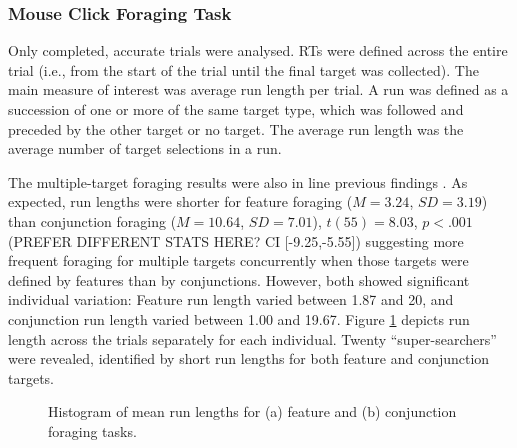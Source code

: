 \documentclass[]{rsos}%
\begin{document}
\subsubsection{Mouse Click Foraging Task}

Only completed, accurate trials were analysed. RTs were defined across the entire trial (i.e., from the start of the trial until the final target was collected). The main measure of interest was average run length per trial. A run was defined as a succession of one or more of the same target type, which was followed and preceded by the other target or no target. The average run length was the average number of target selections in a run. 

The multiple-target foraging results were also in line previous findings \cite{kristjansson2014,johannesson2016}. As expected, run lengths were shorter for feature foraging ($M = 3.24$, $SD = 3.19$) than conjunction foraging ($M = 10.64$, $SD = 7.01$), $t(55) = 8.03$, $p < .001$ (PREFER DIFFERENT STATS HERE? CI [-9.25,-5.55]) suggesting more frequent foraging for multiple targets concurrently when those targets were defined by features than by conjunctions. However, both showed significant individual variation: Feature run length varied between 1.87 and 20, and conjunction run length varied between 1.00 and 19.67. Figure \ref{fig:foraging_summary} depicts run length across the trials separately for each individual. Twenty ``super-searchers'' were revealed, identified by short run lengths for both feature and conjunction targets. 

\begin{figure}
\centering
{}
\caption{Histogram of mean run lengths for (a) feature and (b) conjunction foraging tasks.}
\label{fig:foraging_summary}
\end{figure}
\end{document}
